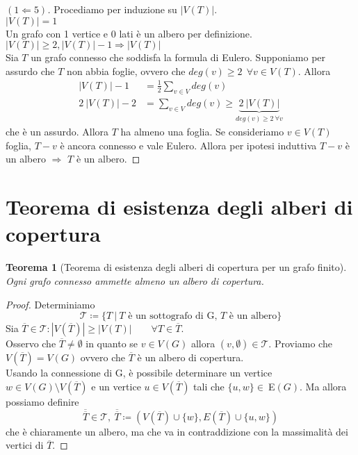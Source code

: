 \documentclass[12pt]{article}
\newcommand{\implica}{\Longrightarrow}
\renewcommand\qedsymbol{$\blacksquare$}
\newcommand{\Eps}{$E\:$}
\newcommand{\MathEps}{E}
\newcommand{\baseinduzalbero}[1]{\\[1\baselineskip]{\boldmath$ |V(T)| = #1$}}
\newcommand{\induzalbero}[1]{\\[1\baselineskip]{\boldmath$|V(T)| \ge #1, |V(T)| -1 \implica |V(T)|$}}
\newtheorem{theorem}{Teorema}
\begin{document}
\renewcommand\qedsymbol{$\blacksquare$}
\begin{proof}[$(1 \Longleftarrow 5)$]
	Procediamo per induzione su $|V(T)|$.
	\baseinduzalbero{1}
	\\ Un grafo con 1 vertice e 0 lati è un albero per definizione.
	\induzalbero{2}\nopagebreak
	\\ Sia $T$ un grafo connesso che soddisfa la formula di Eulero. Supponiamo per assurdo che $T$ non abbia foglie, ovvero che $deg(v) \ge 2 \ \ \forall v \in V(T)$. Allora
	\begin{align*}
		|V(T)| - 1    & = \frac{1}{2} \sum_{v \in V} deg(v)                                            \\
		2\ |V(T) | -2 & = \sum_{v \in V} deg(v) \ge \underbrace{2 \ |V(T)|}_{deg(v) \ge 2 \ \forall v}
	\end{align*}
	che è un assurdo. Allora $T$ ha almeno una foglia. Se consideriamo $v \in V(T)$ foglia, $T-v$ è ancora connesso e vale Eulero. Allora per ipotesi induttiva $T - v$ è un albero $\implica$ $T$ è un albero.
\end{proof}

\section{Teorema di esistenza degli alberi di copertura}
\begin{theorem}[Teorema di esistenza degli alberi di copertura per un grafo finito]
	Ogni grafo connesso ammette almeno un albero di copertura.
\end{theorem}

\begin{proof}
	Determiniamo
	$$ \mathcal{T} \coloneqq \{ T \ | \ \text{$T$ è un sottografo di G, $T$ è un albero} \}$$
	Sia $\overline{T} \in \mathcal{T} : |V(\overline{T}) | \ge |V(T)| \qquad \forall T \in \overline{T}$.
	\\Osservo che $\overline{T} \ne \emptyset$ in quanto se $v \in V(G)$ allora $(v, \emptyset) \in \mathcal{T}$. Proviamo che $V(\overline{T}) = V(G)$ ovvero che $\overline{T}$ è un albero di copertura.\\
	Usando la connessione di G, è possibile determinare un vertice $w \in V(G) \setminus V(\overline{T})$ e un vertice $u \in V(\overline{T})$ tali che $\{u, w\} \in\  \Eps(G)$. Ma allora possiamo definire
	$$ \overline{\overline{T}} \in \mathcal{T},\ \overline{\overline{T}} \coloneqq(V(\overline{T}) \cup \{w\}, \MathEps (\overline{T}) \cup \{u, w\})$$
	che è chiaramente un albero, ma che va in contraddizione con la massimalità dei vertici di $\overline{T}$.
\end{proof}
\end{document}
